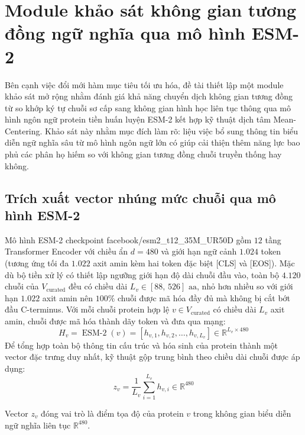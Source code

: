 \section{Module khảo sát không gian tương đồng ngữ nghĩa qua mô hình ESM-2}
\label{sec:methodology_esm2_centering}

Bên cạnh việc đổi mới hàm mục tiêu tối ưu hóa, đề tài thiết lập một module khảo sát mở rộng nhằm đánh giá khả năng chuyển dịch không gian tương đồng từ so khớp ký tự chuỗi sơ cấp sang không gian hình học liên tục thông qua mô hình ngôn ngữ protein tiền huấn luyện ESM-2 kết hợp kỹ thuật dịch tâm Mean-Centering. Khảo sát này nhằm mục đích làm rõ: liệu việc bổ sung thông tin biểu diễn ngữ nghĩa sâu từ mô hình ngôn ngữ lớn có giúp cải thiện thêm năng lực bao phủ các phân họ hiếm so với không gian tương đồng chuỗi truyền thống hay không.

\subsection{Trích xuất vector nhúng mức chuỗi qua mô hình ESM-2}
\label{subsec:esm2_extraction}

Mô hình ESM-2 checkpoint facebook/esm2\_t12\_35M\_UR50D gồm $12$ tầng Transformer Encoder với chiều ẩn $d = 480$ và giới hạn ngữ cảnh $1.024$ token (tương ứng tối đa $1.022$ axit amin kèm hai token đặc biệt [CLS] và [EOS]). Mặc dù bộ tiền xử lý có thiết lập ngưỡng giới hạn độ dài chuỗi đầu vào, toàn bộ $4.120$ chuỗi của $V_{\text{curated}}$ đều có chiều dài $L_v \in [88, \, 526]\text{ aa}$, nhỏ hơn nhiều so với giới hạn $1.022$ axit amin nên $100\%$ chuỗi được mã hóa đầy đủ mà không bị cắt bớt đầu C-terminus. Với mỗi chuỗi protein hợp lệ $v \in V_{\text{curated}}$ có chiều dài $L_v$ axit amin, chuỗi được mã hóa thành dãy token và đưa qua mạng:
\begin{equation}
H_v = \operatorname{ESM-2}(v) = [h_{v, 1}, h_{v, 2}, \dots, h_{v, L_v}] \in \mathbb{R}^{L_v \times 480}
\end{equation}
Để tổng hợp toàn bộ thông tin cấu trúc và hóa sinh của protein thành một vector đặc trưng duy nhất, kỹ thuật gộp trung bình theo chiều dài chuỗi được áp dụng:
\begin{equation}
\label{eq:sequence_mean_pooling}
z_v = \frac{1}{L_v} \sum_{i=1}^{L_v} h_{v, i} \in \mathbb{R}^{480}
\end{equation}

Vector $z_v$ đóng vai trò là điểm tọa độ của protein $v$ trong không gian biểu diễn ngữ nghĩa liên tục $\mathbb{R}^{480}$.

